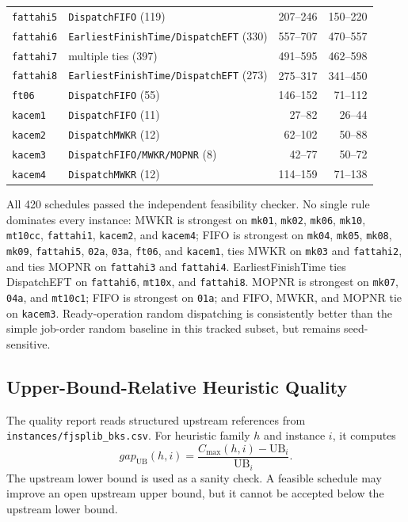 ﻿\documentclass[11pt]{article}
\begin{document}
\begin{table}[h]
\begin{tabular}{llrr}
\texttt{fattahi5} & \texttt{DispatchFIFO} (119) & 207--246 & 150--220 \\
\texttt{fattahi6} & \texttt{EarliestFinishTime/DispatchEFT} (330) & 557--707 & 470--557 \\
\texttt{fattahi7} & multiple ties (397) & 491--595 & 462--598 \\
\texttt{fattahi8} & \texttt{EarliestFinishTime/DispatchEFT} (273) & 275--317 & 341--450 \\
\texttt{ft06} & \texttt{DispatchFIFO} (55) & 146--152 & 71--112 \\
\texttt{kacem1} & \texttt{DispatchFIFO} (11) & 27--82 & 26--44 \\
\texttt{kacem2} & \texttt{DispatchMWKR} (12) & 62--102 & 50--88 \\
\texttt{kacem3} & \texttt{DispatchFIFO/MWKR/MOPNR} (8) & 42--77 & 50--72 \\
\texttt{kacem4} & \texttt{DispatchMWKR} (12) & 114--159 & 71--138 \\
\bottomrule
\end{tabular}
\end{table}

All 420 schedules passed the independent feasibility checker. No single rule
dominates every instance: MWKR is strongest on \texttt{mk01}, \texttt{mk02},
\texttt{mk06}, \texttt{mk10}, \texttt{mt10cc}, \texttt{fattahi1}, \texttt{kacem2}, and \texttt{kacem4}; FIFO is strongest on
\texttt{mk04}, \texttt{mk05}, \texttt{mk08}, \texttt{mk09}, \texttt{fattahi5},
\texttt{02a}, \texttt{03a}, \texttt{ft06}, and \texttt{kacem1}, ties MWKR on
\texttt{mk03} and \texttt{fattahi2}, and ties MOPNR on \texttt{fattahi3} and
\texttt{fattahi4}. EarliestFinishTime ties DispatchEFT on \texttt{fattahi6},
\texttt{mt10x}, and \texttt{fattahi8}.
MOPNR is strongest on \texttt{mk07}, \texttt{04a}, and
\texttt{mt10c1}; FIFO is strongest on \texttt{01a}; and FIFO, MWKR, and MOPNR
tie on \texttt{kacem3}. Ready-operation random
dispatching is consistently better than the simple job-order random baseline
in this tracked subset, but remains seed-sensitive.

\clearpage
\subsection{Upper-Bound-Relative Heuristic Quality}

The quality report reads structured upstream references from
\texttt{instances/fjsplib\_bks.csv}. For heuristic family $h$ and instance
$i$, it computes
\[
gap_{\mathrm{UB}}(h,i)
= \frac{C_{\max}(h,i)-\mathrm{UB}_i}{\mathrm{UB}_i}.
\]
The upstream lower bound is used as a sanity check. A feasible schedule may
improve an open upstream upper bound, but it cannot be accepted below the
upstream lower bound.
\end{document}
